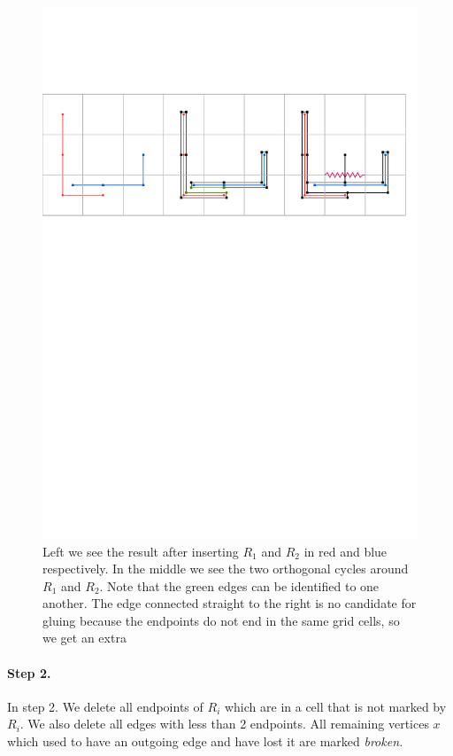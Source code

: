 \documentclass[a4paper,UKenglish,cleveref]{lipics-v2019}
\begin{document}
\begin{figure}[H]
\centering
\includegraphics[page = 1]{Figures/cycle.pdf}
\caption{Left we see the result after inserting $R_1$ and $R_2$ in red and blue respectively. In the middle we see the two orthogonal cycles around $R_1$ and $R_2$. Note that the green edges can be identified to one another. The edge connected straight to the right is no candidate for gluing because the endpoints do not end in the same grid cells, so we get an extra }
\label{fig:cycle}
\end{figure}

\paragraph*{Step 2.}

In step 2. We delete all endpoints of $R_i$ which are in a cell that is not marked by $R_i$. We also delete all edges with less than 2 endpoints. All remaining vertices $x$ which used to have an outgoing edge and have lost it are marked \emph{broken.}
\end{document}

